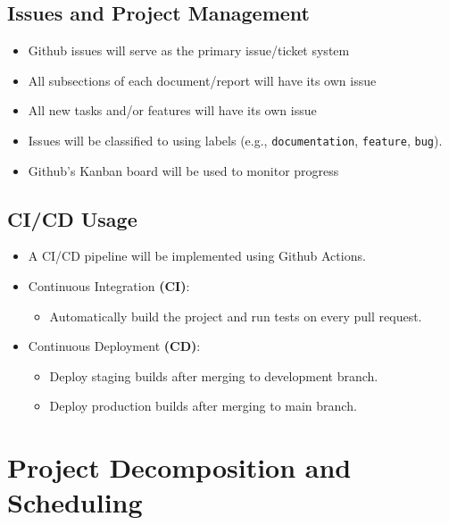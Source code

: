 \documentclass{article}
\begin{document}
\subsection{Issues and Project Management}
\begin{itemize}
    \item Github issues will serve as the primary issue/ticket system
    \item All subsections of each document/report will have its own issue
    \item All new tasks and/or features will have its own issue
    \item Issues will be classified to using labels (e.g., \texttt{documentation}, \texttt{feature}, \texttt{bug}).
    \item Github's Kanban board will be used to monitor progress
\end{itemize}

\subsection{CI/CD Usage}
\begin{itemize}
    \item A CI/CD pipeline will be implemented using Github Actions.
    \item Continuous Integration \textbf{(CI)}:
    \begin{itemize}
        \item Automatically build the project and run tests on every pull request.
    \end{itemize}
    \item Continuous Deployment \textbf{(CD)}:
    \begin{itemize}
        \item Deploy staging builds after merging to development branch.
        \item Deploy production builds after merging to main branch.
    \end{itemize}
\end{itemize}

\section{Project Decomposition and Scheduling}
\end{document}
